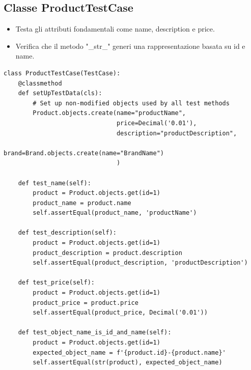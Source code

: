 \subsection{Classe ProductTestCase}
\begin{itemize}
    \item Testa gli attributi fondamentali come name, description e price.
    \item Verifica che il metodo "\_str\_" generi una rappresentazione basata su id e name.
\end{itemize}
\begin{listing}[!ht]
\begin{verbatim}
class ProductTestCase(TestCase):
    @classmethod
    def setUpTestData(cls):
        # Set up non-modified objects used by all test methods
        Product.objects.create(name="productName",
                               price=Decimal('0.01'),
                               description="productDescription",
                               brand=Brand.objects.create(name="BrandName")
                               )

    def test_name(self):
        product = Product.objects.get(id=1)
        product_name = product.name
        self.assertEqual(product_name, 'productName')

    def test_description(self):
        product = Product.objects.get(id=1)
        product_description = product.description
        self.assertEqual(product_description, 'productDescription')

    def test_price(self):
        product = Product.objects.get(id=1)
        product_price = product.price
        self.assertEqual(product_price, Decimal('0.01'))

    def test_object_name_is_id_and_name(self):
        product = Product.objects.get(id=1)
        expected_object_name = f'{product.id}-{product.name}'
        self.assertEqual(str(product), expected_object_name)
\end{verbatim}
\end{listing}

\clearpage
